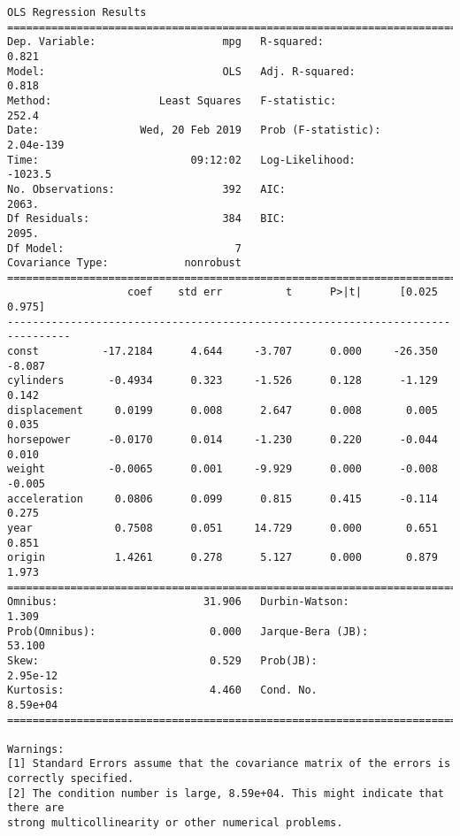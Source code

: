 \documentclass[11pt]{article}
\begin{document}
    \begin{Verbatim}[commandchars=\\\{\}]
                            OLS Regression Results                            
==============================================================================
Dep. Variable:                    mpg   R-squared:                       0.821
Model:                            OLS   Adj. R-squared:                  0.818
Method:                 Least Squares   F-statistic:                     252.4
Date:                Wed, 20 Feb 2019   Prob (F-statistic):          2.04e-139
Time:                        09:12:02   Log-Likelihood:                -1023.5
No. Observations:                 392   AIC:                             2063.
Df Residuals:                     384   BIC:                             2095.
Df Model:                           7                                         
Covariance Type:            nonrobust                                         
================================================================================
                   coef    std err          t      P>|t|      [0.025      0.975]
--------------------------------------------------------------------------------
const          -17.2184      4.644     -3.707      0.000     -26.350      -8.087
cylinders       -0.4934      0.323     -1.526      0.128      -1.129       0.142
displacement     0.0199      0.008      2.647      0.008       0.005       0.035
horsepower      -0.0170      0.014     -1.230      0.220      -0.044       0.010
weight          -0.0065      0.001     -9.929      0.000      -0.008      -0.005
acceleration     0.0806      0.099      0.815      0.415      -0.114       0.275
year             0.7508      0.051     14.729      0.000       0.651       0.851
origin           1.4261      0.278      5.127      0.000       0.879       1.973
==============================================================================
Omnibus:                       31.906   Durbin-Watson:                   1.309
Prob(Omnibus):                  0.000   Jarque-Bera (JB):               53.100
Skew:                           0.529   Prob(JB):                     2.95e-12
Kurtosis:                       4.460   Cond. No.                     8.59e+04
==============================================================================

Warnings:
[1] Standard Errors assume that the covariance matrix of the errors is correctly specified.
[2] The condition number is large, 8.59e+04. This might indicate that there are
strong multicollinearity or other numerical problems.

    \end{Verbatim}
\end{document}
